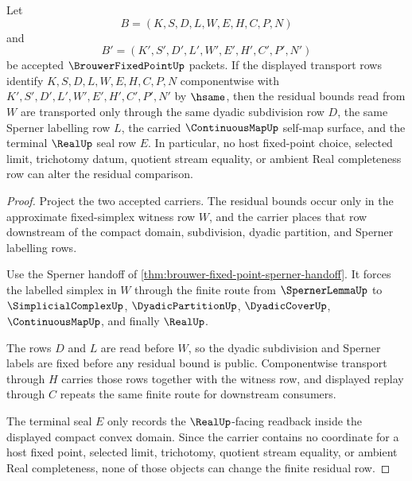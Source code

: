 \begin{theorem}
\label{thm:brouwer-fixed-point-finite-residual-stability}
Let
$$
B=(K,S,D,L,W,E,H,C,P,N)
$$
and
$$
B'=(K',S',D',L',W',E',H',C',P',N')
$$
be accepted $\BrouwerFixedPointUp$ packets. If the displayed transport rows identify $K,S,D,L,W,E,H,C,P,N$ componentwise with $K',S',D',L',W',E',H',C',P',N'$ by $\hsame$, then the residual bounds read from $W$ are transported only through the same dyadic subdivision row $D$, the same Sperner labelling row $L$, the carried $\ContinuousMapUp$ self-map surface, and the terminal $\RealUp$ seal row $E$. In particular, no host fixed-point choice, selected limit, trichotomy datum, quotient stream equality, or ambient Real completeness row can alter the residual comparison.
\end{theorem}
\begin{proof}
Project the two accepted carriers. The residual bounds occur only in the approximate fixed-simplex witness row $W$, and the carrier places that row downstream of the compact domain, subdivision, dyadic partition, and Sperner labelling rows.

Use the Sperner handoff of \autoref{thm:brouwer-fixed-point-sperner-handoff}. It forces the labelled simplex in $W$ through the finite route from $\SpernerLemmaUp$ to $\SimplicialComplexUp$, $\DyadicPartitionUp$, $\DyadicCoverUp$, $\ContinuousMapUp$, and finally $\RealUp$.

The rows $D$ and $L$ are read before $W$, so the dyadic subdivision and Sperner labels are fixed before any residual bound is public. Componentwise transport through $H$ carries those rows together with the witness row, and displayed replay through $C$ repeats the same finite route for downstream consumers.

The terminal seal $E$ only records the $\RealUp$-facing readback inside the displayed compact convex domain. Since the carrier contains no coordinate for a host fixed point, selected limit, trichotomy, quotient stream equality, or ambient Real completeness, none of those objects can change the finite residual row.
\end{proof}


